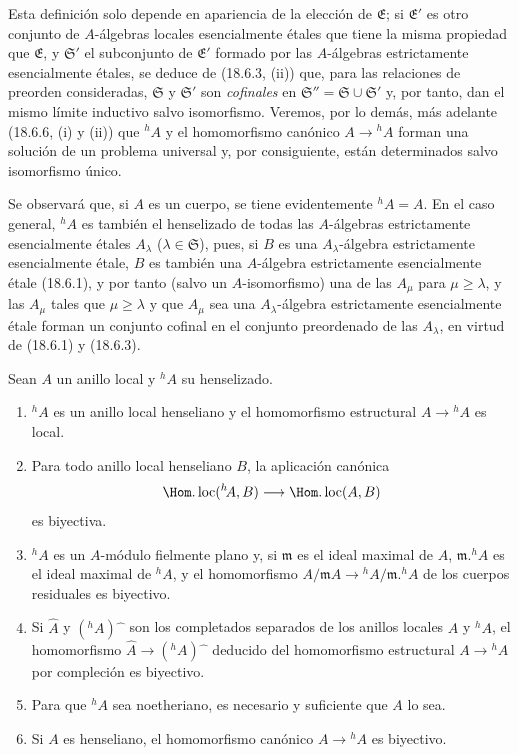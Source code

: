 Esta definición solo depende en apariencia de la elección de $\mathfrak E$; si $\mathfrak E'$ es otro conjunto de $A$-álgebras locales esencialmente étales que tiene la misma propiedad que $\mathfrak E$, y $\mathfrak S'$ el subconjunto de $\mathfrak E'$ formado por las $A$-álgebras estrictamente esencialmente étales, se deduce de (18.6.3, (ii)) que, para las relaciones de preorden consideradas, $\mathfrak S$ y $\mathfrak S'$ son \emph{cofinales} en $\mathfrak S''=\mathfrak S\cup\mathfrak S'$ y, por tanto, dan el mismo límite inductivo salvo isomorfismo. Veremos, por lo demás, más adelante (18.6.6, (i) y (ii)) que ${}^h\!A$ y el homomorfismo canónico $A\to{}^h\!A$ forman una solución de un problema universal y, por consiguiente, están determinados salvo isomorfismo único.

Se observará que, si $A$ es un cuerpo, se tiene evidentemente ${}^h\!A=A$. En el caso general, ${}^h\!A$ es también el henselizado de todas las $A$-álgebras estrictamente esencialmente étales $A_\lambda$ ($\lambda\in\mathfrak S$), pues, si $B$ es una $A_\lambda$-álgebra estrictamente esencialmente étale, $B$ es también una $A$-álgebra estrictamente esencialmente étale (18.6.1), y por tanto (salvo un $A$-isomorfismo) una de las $A_\mu$ para $\mu\geq\lambda$, y las $A_\mu$ tales que $\mu\geq\lambda$ y que $A_\mu$ sea una $A_\lambda$-álgebra estrictamente esencialmente étale forman un conjunto cofinal en el conjunto preordenado de las $A_\lambda$, en virtud de (18.6.1) y (18.6.3).

\begin{theorem}[18.6.6]
\label{IV.18.6.6}
Sean $A$ un anillo local y ${}^h\!A$ su henselizado.
\begin{enumerate}
  \item[\textup{(i)}] ${}^h\!A$ es un anillo local henseliano y el homomorfismo estructural $A\to{}^h\!A$ es local.
  \item[\textup{(ii)}] Para todo anillo local henseliano $B$, la aplicación canónica
  \[
    \Hom.\operatorname{loc}({}^h\!A,B)\longrightarrow\Hom.\operatorname{loc}(A,B)
  \]
  es biyectiva.
  \item[\textup{(iii)}] ${}^h\!A$ es un $A$-módulo fielmente plano y, si $\mathfrak m$ es el ideal maximal de $A$, $\mathfrak m.{}^h\!A$ es el ideal maximal de ${}^h\!A$, y el homomorfismo $A/\mathfrak mA\to{}^h\!A/\mathfrak m.{}^h\!A$ de los cuerpos residuales es biyectivo.
  \item[\textup{(iv)}] Si $\widehat A$ y $({}^h\!A)\widehat{\phantom{x}}$ son los completados separados de los anillos locales $A$ y ${}^h\!A$, el homomorfismo $\widehat A\to({}^h\!A)\widehat{\phantom{x}}$ deducido del homomorfismo estructural $A\to{}^h\!A$ por compleción es biyectivo.
  \item[\textup{(v)}] Para que ${}^h\!A$ sea noetheriano, es necesario y suficiente que $A$ lo sea.
  \item[\textup{(vi)}] Si $A$ es henseliano, el homomorfismo canónico $A\to{}^h\!A$ es biyectivo.
\end{enumerate}
\end{theorem}

